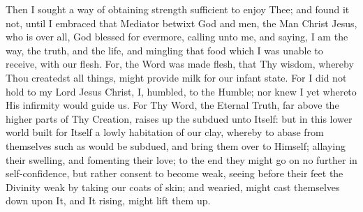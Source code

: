 \documentclass[b5paper,openright,12pt,twoside]{book}
\begin{document}
Then I sought a way of obtaining strength sufficient to enjoy Thee; and
found it not, until I embraced that Mediator betwixt God and men, the
Man Christ Jesus, who is over all, God blessed for evermore, calling
unto me, and saying, I am the way, the truth, and the life, and mingling
that food which I was unable to receive, with our flesh. For, the Word
was made flesh, that Thy wisdom, whereby Thou createdst all things,
might provide milk for our infant state. For I did not hold to my Lord
Jesus Christ, I, humbled, to the Humble; nor knew I yet whereto His
infirmity would guide us. For Thy Word, the Eternal Truth, far above the
higher parts of Thy Creation, raises up the subdued unto Itself: but
in this lower world built for Itself a lowly habitation of our clay,
whereby to abase from themselves such as would be subdued, and bring
them over to Himself; allaying their swelling, and fomenting their love;
to the end they might go on no further in self-confidence, but rather
consent to become weak, seeing before their feet the Divinity weak by
taking our coats of skin; and wearied, might cast themselves down upon
It, and It rising, might lift them up.
\end{document}
